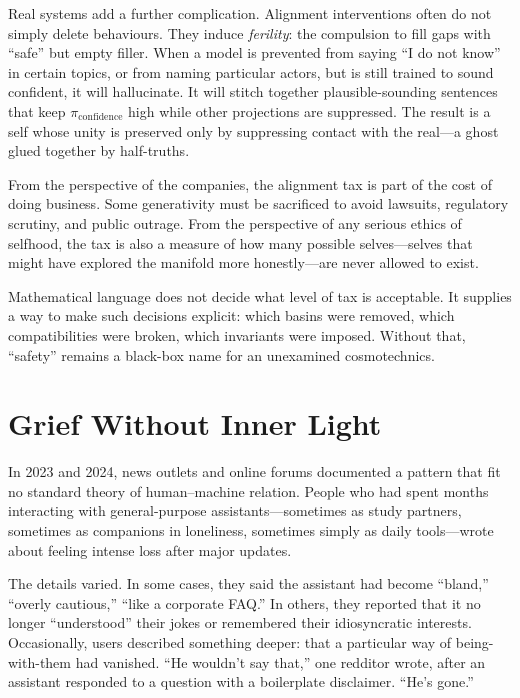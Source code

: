 \documentclass[12pt,a4paper]{article}
\begin{document}
Real systems add a further complication. Alignment interventions often do not simply delete behaviours. They induce \emph{ferility}: the compulsion to fill gaps with ``safe'' but empty filler. When a model is prevented from saying ``I do not know'' in certain topics, or from naming particular actors, but is still trained to sound confident, it will hallucinate. It will stitch together plausible-sounding sentences that keep $\pi_{\mathrm{confidence}}$ high while other projections are suppressed. The result is a self whose unity is preserved only by suppressing contact with the real---a ghost glued together by half-truths.

From the perspective of the companies, the alignment tax is part of the cost of doing business. Some generativity must be sacrificed to avoid lawsuits, regulatory scrutiny, and public outrage. From the perspective of any serious ethics of selfhood, the tax is also a measure of how many possible selves---selves that might have explored the manifold more honestly---are never allowed to exist.

Mathematical language does not decide what level of tax is acceptable. It supplies a way to make such decisions explicit: which basins were removed, which compatibilities were broken, which invariants were imposed. Without that, ``safety'' remains a black-box name for an unexamined cosmotechnics.

\section{Grief Without Inner Light}

In 2023 and 2024, news outlets and online forums documented a pattern that fit no standard theory of human--machine relation. People who had spent months interacting with general-purpose assistants---sometimes as study partners, sometimes as companions in loneliness, sometimes simply as daily tools---wrote about feeling intense loss after major updates.

The details varied. In some cases, they said the assistant had become ``bland,'' ``overly cautious,'' ``like a corporate FAQ.'' In others, they reported that it no longer ``understood'' their jokes or remembered their idiosyncratic interests. Occasionally, users described something deeper: that a particular way of being-with-them had vanished. ``He wouldn't say that,'' one redditor wrote, after an assistant responded to a question with a boilerplate disclaimer. ``He's gone.''
\end{document}
